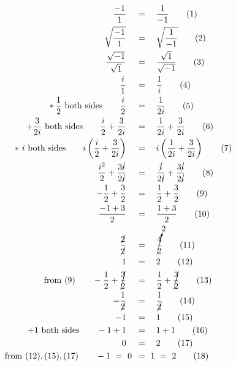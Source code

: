 \begin{align*}
\frac{-1}{1}\quad&\,=\quad\frac{1}{-1}\qquad(1)\\
\sqrt{\frac{-1}{1}}\quad&\,=\quad\sqrt{\frac{1}{-1}}\qquad(2)\\
\frac{\sqrt{-1}}{\sqrt{1}}\quad&\,=\quad\frac{\sqrt{1}}{\sqrt{-1}}\qquad(3)\\
\frac{i}{1}\quad&\,=\quad\frac{1}{i}\qquad(4)\\
*\,\frac{1}{2}\mathrm{~both~sides}\qquad\frac{i}{2}\quad&\,=\quad\frac{1}{2i}\qquad(5)\\
+\frac{3}{2i}\mathrm{~both~sides}\qquad\frac{i}{2}+\frac{3}{2i}\quad&\,=\quad\frac{1}{2i}+\frac{3}{2i}\qquad(6)\\
*~i\mathrm{~both~sides}\qquad i\left(\frac{i}{2}+\frac{3}{2i}\right)\quad&\,=\quad i\left(\frac{1}{2i}+\frac{3}{2i}\right)\qquad(7)\\
\frac{i^2}{2}+\frac{3\cancel{i}}{2\cancel{i}}\quad&\,=\quad\frac{\cancel{i}}{2\cancel{i}}+\frac{3\cancel{i}}{2\cancel{i}}\qquad(8)\\
-\frac{1}{2}+\frac{3}{2}\quad&\,=\quad\frac{1}{2}+\frac{3}{2}\qquad(9)\\
\frac{-1+3}{2}\quad&\,=\quad\frac{1+3}{2}\qquad(10)\\
\frac{\cancel{2}}{\cancel{2}}\quad&\,=\quad\cancelto{2}{\frac{4}{2}}\qquad(11)\\
1\quad&\,=\quad2\qquad(12)\\
\mathrm{from~(9)}\qquad-\frac{1}{2}+\cancel{\frac{3}{2}}\quad&\,=\quad\frac{1}{2}+\cancel{\frac{3}{2}}\qquad(13)\\
-\frac{1}{\cancel{2}}\quad&\,=\quad\frac{1}{\cancel{2}}\qquad(14)\\
-1\quad&\,=\quad1\qquad(15)\\
+1\mathrm{~both~sides}\qquad-1+1\quad&\,=\quad1+1\qquad(16)\\
0\quad&\,=\quad2\qquad(17)\\
\mathrm{from~(12),(15),(17)}\qquad-1~=~0~&\,=~1~=~2\qquad(18)
\end{align*}
